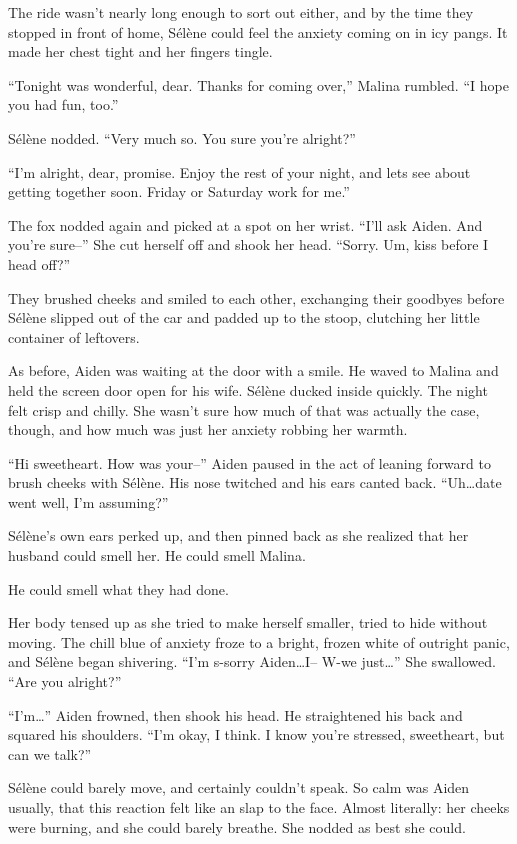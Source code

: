 The ride wasn't nearly long enough to sort out either, and by the time they stopped in front of home, Sélène could feel the anxiety coming on in icy pangs. It made her chest tight and her fingers tingle.

``Tonight was wonderful, dear. Thanks for coming over,'' Malina rumbled. ``I hope you had fun, too.''

Sélène nodded. ``Very much so. You sure you're alright?''

``I'm alright, dear, promise. Enjoy the rest of your night, and lets see about getting together soon. Friday or Saturday work for me.''

The fox nodded again and picked at a spot on her wrist. ``I'll ask Aiden. And you're sure--'' She cut herself off and shook her head. ``Sorry. Um, kiss before I head off?''

They brushed cheeks and smiled to each other, exchanging their goodbyes before Sélène slipped out of the car and padded up to the stoop, clutching her little container of leftovers.

As before, Aiden was waiting at the door with a smile. He waved to Malina and held the screen door open for his wife. Sélène ducked inside quickly. The night felt crisp and chilly. She wasn't sure how much of that was actually the case, though, and how much was just her anxiety robbing her warmth.

``Hi sweetheart. How was your--'' Aiden paused in the act of leaning forward to brush cheeks with Sélène. His nose twitched and his ears canted back. ``Uh\ldots{}date went well, I'm assuming?''

Sélène's own ears perked up, and then pinned back as she realized that her husband could smell her. He could smell Malina.

He could smell what they had done.

Her body tensed up as she tried to make herself smaller, tried to hide without moving. The chill blue of anxiety froze to a bright, frozen white of outright panic, and Sélène began shivering. ``I'm s-sorry Aiden\ldots{}I-- W-we just\ldots{}'' She swallowed. ``Are you alright?''

``I'm\ldots{}'' Aiden frowned, then shook his head. He straightened his back and squared his shoulders. ``I'm okay, I think. I know you're stressed, sweetheart, but can we talk?''

Sélène could barely move, and certainly couldn't speak. So calm was Aiden usually, that this reaction felt like an slap to the face. Almost literally: her cheeks were burning, and she could barely breathe. She nodded as best she could.

